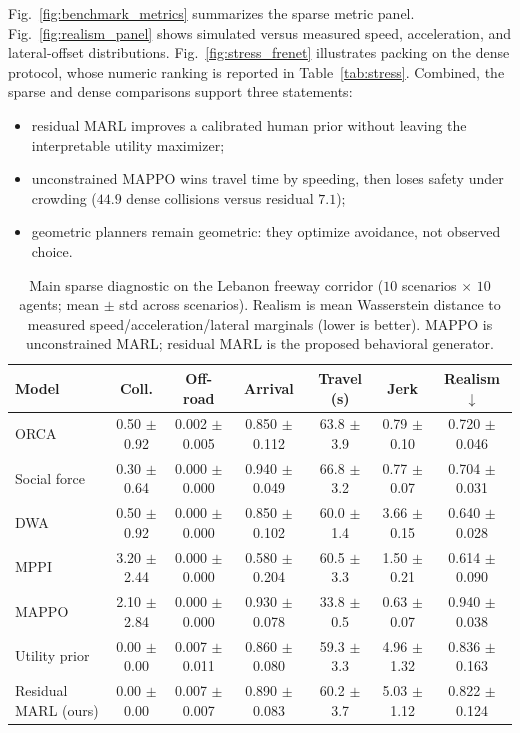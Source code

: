 \documentclass[conference]{IEEEtran}
\begin{document}
Fig.~\ref{fig:benchmark_metrics} summarizes the sparse metric panel. Fig.~\ref{fig:realism_panel} shows simulated versus measured speed, acceleration, and lateral-offset distributions. Fig.~\ref{fig:stress_frenet} illustrates packing on the dense protocol, whose numeric ranking is reported in Table~\ref{tab:stress}. Combined, the sparse and dense comparisons support three statements:
\begin{itemize}
    \item residual MARL improves a calibrated human prior without leaving the interpretable utility maximizer;
    \item unconstrained MAPPO wins travel time by speeding, then loses safety under crowding ($44.9$ dense collisions versus residual $7.1$);
    \item geometric planners remain geometric: they optimize avoidance, not observed choice.
\end{itemize}

\begin{table}[!t]
\centering
\caption{Main sparse diagnostic on the Lebanon freeway corridor ($10$ scenarios $\times$ $10$ agents; mean $\pm$ std across scenarios). Realism is mean Wasserstein distance to measured speed/acceleration/lateral marginals (lower is better). MAPPO is unconstrained MARL; residual MARL is the proposed behavioral generator.}
\label{tab:benchmark_main}
\begin{tabular}{lcccccc}
\toprule
Model & Coll. & Off-road & Arrival & Travel (s) & Jerk & Realism $\downarrow$ \\
\midrule
ORCA & 0.50 $\pm$ 0.92 & 0.002 $\pm$ 0.005 & 0.850 $\pm$ 0.112 & 63.8 $\pm$ 3.9 & 0.79 $\pm$ 0.10 & 0.720 $\pm$ 0.046 \\
Social force & 0.30 $\pm$ 0.64 & 0.000 $\pm$ 0.000 & 0.940 $\pm$ 0.049 & 66.8 $\pm$ 3.2 & 0.77 $\pm$ 0.07 & 0.704 $\pm$ 0.031 \\
DWA & 0.50 $\pm$ 0.92 & 0.000 $\pm$ 0.000 & 0.850 $\pm$ 0.102 & 60.0 $\pm$ 1.4 & 3.66 $\pm$ 0.15 & 0.640 $\pm$ 0.028 \\
MPPI & 3.20 $\pm$ 2.44 & 0.000 $\pm$ 0.000 & 0.580 $\pm$ 0.204 & 60.5 $\pm$ 3.3 & 1.50 $\pm$ 0.21 & 0.614 $\pm$ 0.090 \\
MAPPO & 2.10 $\pm$ 2.84 & 0.000 $\pm$ 0.000 & 0.930 $\pm$ 0.078 & 33.8 $\pm$ 0.5 & 0.63 $\pm$ 0.07 & 0.940 $\pm$ 0.038 \\
Utility prior & 0.00 $\pm$ 0.00 & 0.007 $\pm$ 0.011 & 0.860 $\pm$ 0.080 & 59.3 $\pm$ 3.3 & 4.96 $\pm$ 1.32 & 0.836 $\pm$ 0.163 \\
Residual MARL (ours) & 0.00 $\pm$ 0.00 & 0.007 $\pm$ 0.007 & 0.890 $\pm$ 0.083 & 60.2 $\pm$ 3.7 & 5.03 $\pm$ 1.12 & 0.822 $\pm$ 0.124 \\
\bottomrule
\end{tabular}
\end{table}
\end{document}
